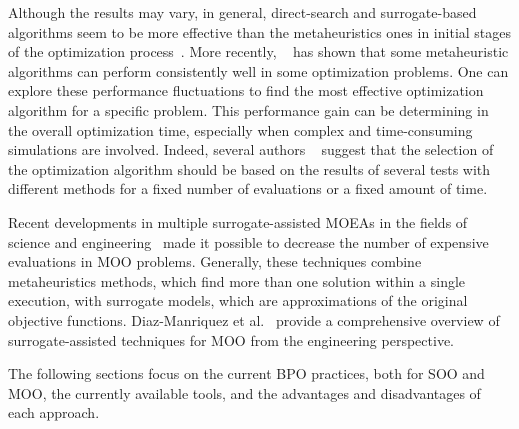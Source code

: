 	Although the results may vary, in general, direct-search and surrogate-based algorithms seem to be more effective than the metaheuristics ones in initial stages of the optimization process~\cite{Wortmann2017,Wortmann2016BBO,Wortmann2017GABESTCHOICE}. More recently, ~\cite{Waibel2018} has shown that some metaheuristic algorithms can perform consistently well in some optimization problems. One can explore these performance fluctuations to find the most effective optimization algorithm for a specific problem. This performance gain can be determining in the overall optimization time, especially when complex and time-consuming simulations are involved. Indeed, several authors ~\cite{Wortmann2016BBO,Hamdy2016} suggest that the selection of the optimization algorithm should be based on the results of several tests with different methods for a fixed number of evaluations or a fixed amount of time. 
	
	
	Recent developments in multiple surrogate-assisted \acp{MOEA} in the fields of science and engineering~\cite{Zapotecas-Martinez2016,Hussein2016} made it possible to decrease the number of expensive evaluations in \ac{MOO} problems. Generally, these techniques combine metaheuristics methods, which find more than one solution within a single execution, with surrogate models, which are approximations of the original objective functions. Diaz-Manriquez et al.~\cite{Diaz-Manriquez2016} provide a comprehensive overview of surrogate-assisted techniques for \ac{MOO} from the engineering perspective. 
	
	The following sections focus on the current \ac{BPO} practices, both for \ac{SOO} and \ac{MOO}, the currently available tools, and the advantages and disadvantages of each approach.
	
